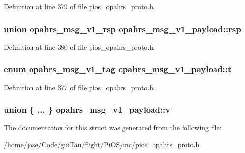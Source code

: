 Definition at line 379 of file pios\-\_\-opahrs\-\_\-proto.\-h.

\hypertarget{structopahrs__msg__v1__payload_a360508e3914da1cf37129111839d9bb9}{
\subsubsection[{rsp}]{\setlength{\rightskip}{0pt plus 5cm}union {\bf opahrs\-\_\-msg\-\_\-v1\-\_\-rsp} opahrs\-\_\-msg\-\_\-v1\-\_\-payload\-::rsp}}\label{structopahrs__msg__v1__payload_a360508e3914da1cf37129111839d9bb9}


Definition at line 380 of file pios\-\_\-opahrs\-\_\-proto.\-h.

\hypertarget{structopahrs__msg__v1__payload_a4d8c4463488f7e9ea04e84e7de200425}{
\subsubsection[{t}]{\setlength{\rightskip}{0pt plus 5cm}enum {\bf opahrs\-\_\-msg\-\_\-v1\-\_\-tag} opahrs\-\_\-msg\-\_\-v1\-\_\-payload\-::t}}\label{structopahrs__msg__v1__payload_a4d8c4463488f7e9ea04e84e7de200425}


Definition at line 377 of file pios\-\_\-opahrs\-\_\-proto.\-h.

\hypertarget{structopahrs__msg__v1__payload_ab956f79a373f50fc6d8aaa893a9b4680}{
\subsubsection[{v}]{\setlength{\rightskip}{0pt plus 5cm}union \{ ... \}   opahrs\-\_\-msg\-\_\-v1\-\_\-payload\-::v}}\label{structopahrs__msg__v1__payload_ab956f79a373f50fc6d8aaa893a9b4680}


The documentation for this struct was generated from the following file\-:\begin{DoxyCompactItemize}
\item 
/home/jose/\-Code/gui\-Tau/flight/\-Pi\-O\-S/inc/\hyperlink{pios__opahrs__proto_8h}{pios\-\_\-opahrs\-\_\-proto.\-h}\end{DoxyCompactItemize}
